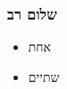 \documentclass[ignorenonframetext,notheorems]{beamer}
\begin{document}
\begin{frame}
  \frametitle{שלום רב}
\begin{itemize}
\item אחת 
\item שתיים 
\end{itemize}
\end{frame}



\end{document}
